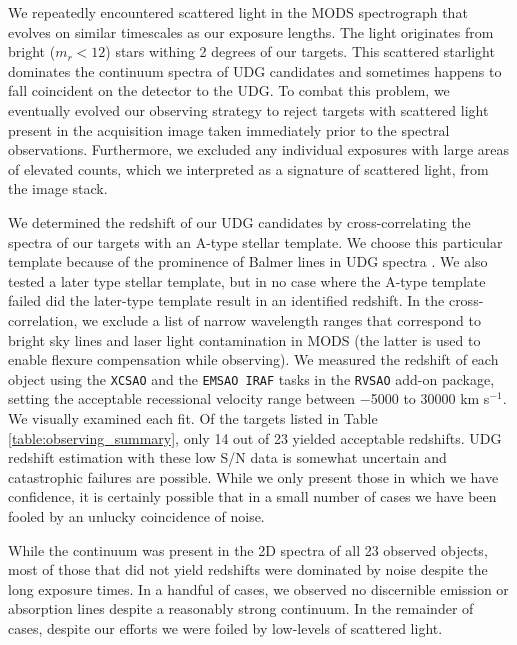 \documentclass[twocolumn,tighten]{aastex63}
\begin{document}
We repeatedly encountered scattered light in the MODS spectrograph that evolves on similar timescales as our exposure lengths. The light originates from bright ($m_r < 12$) stars withing 2 degrees of our targets. This scattered starlight dominates the continuum spectra of UDG candidates and sometimes happens to fall coincident on the detector to the UDG. To combat this problem, we eventually evolved our observing strategy to reject targets with scattered light present in the acquisition image taken immediately prior to the spectral observations. Furthermore, we excluded any individual  exposures with large areas of elevated counts, which we interpreted as a signature of scattered light, from the image stack.

We determined the redshift of our UDG candidates by cross-correlating the spectra of our targets with an A-type stellar template. We choose this particular template because of the prominence of Balmer lines in UDG spectra \citep{Kadowaki17}. We also tested a later type stellar template, but in no case where the A-type template failed did the later-type template result in an identified redshift. In the cross-correlation, we exclude a list of narrow wavelength ranges that correspond to bright sky lines and laser light contamination in MODS (the latter is used to enable flexure compensation while observing). We measured the redshift of each object using the {\tt XCSAO} and the {\tt EMSAO IRAF} tasks in the {\tt RVSAO} add-on package, setting the acceptable recessional velocity range between $-$5000 to 30000 km s$^{-1}$. We visually examined each fit. Of the targets listed in Table \ref{table:observing_summary}, only 14 out of 23 yielded acceptable redshifts. UDG redshift estimation with these low S/N data is somewhat uncertain and catastrophic failures are possible. While we only present those in which we have confidence, it is certainly possible that in a small number of cases we have been fooled by an unlucky coincidence of noise.

While the continuum was present in the 2D spectra of all 23 observed objects, most of those that did not yield redshifts were dominated by noise despite the long exposure times. In a handful of cases, we observed no discernible emission or absorption lines despite a reasonably strong continuum. In the remainder of cases, despite our efforts we were foiled by low-levels of scattered light.

\end{document}
